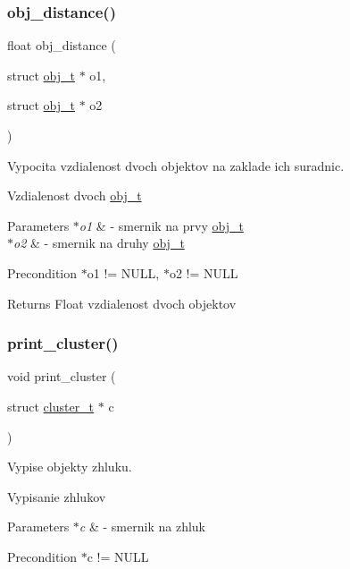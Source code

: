 \subsubsection{\texorpdfstring{obj\+\_\+distance()}{obj\_distance()}}
{\footnotesize\ttfamily float obj\+\_\+distance (\begin{DoxyParamCaption}\item[{struct \hyperlink{structobj__t}{obj\+\_\+t} $\ast$}]{o1,  }\item[{struct \hyperlink{structobj__t}{obj\+\_\+t} $\ast$}]{o2 }\end{DoxyParamCaption})}



Vypocita vzdialenost dvoch objektov na zaklade ich suradnic. 

Vzdialenost dvoch \hyperlink{structobj__t}{obj\+\_\+t} 
\begin{DoxyParams}{Parameters}
{\em $\ast$o1} & -\/ smernik na prvy \hyperlink{structobj__t}{obj\+\_\+t} \\
\hline
{\em $\ast$o2} & -\/ smernik na druhy \hyperlink{structobj__t}{obj\+\_\+t} \\
\hline
\end{DoxyParams}
\begin{DoxyPrecond}{Precondition}
$\ast$o1 != N\+U\+LL, $\ast$o2 != N\+U\+LL 
\end{DoxyPrecond}
\begin{DoxyReturn}{Returns}
Float vzdialenost dvoch objektov 
\end{DoxyReturn}
\hypertarget{group___praca_ga322bfd43ab7a3fa830cd69e79b7eef06}{}\label{group___praca_ga322bfd43ab7a3fa830cd69e79b7eef06} 
\subsubsection{\texorpdfstring{print\+\_\+cluster()}{print\_cluster()}}
{\footnotesize\ttfamily void print\+\_\+cluster (\begin{DoxyParamCaption}\item[{struct \hyperlink{structcluster__t}{cluster\+\_\+t} $\ast$}]{c }\end{DoxyParamCaption})}



Vypise objekty zhluku. 

Vypisanie zhlukov 
\begin{DoxyParams}{Parameters}
{\em $\ast$c} & -\/ smernik na zhluk \\
\hline
\end{DoxyParams}
\begin{DoxyPrecond}{Precondition}
$\ast$c != N\+U\+LL 
\end{DoxyPrecond}
\hypertarget{group___praca_gad350e6021e5fead00ff2eeec4d134525}{}\label{group___praca_gad350e6021e5fead00ff2eeec4d134525} 
